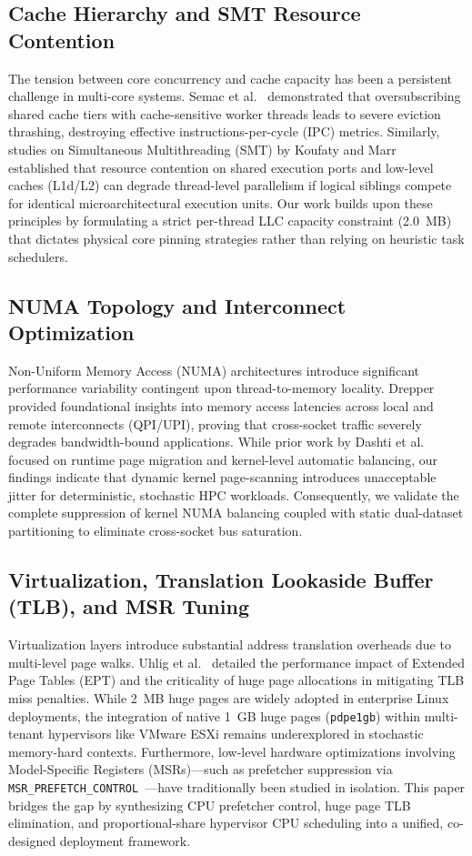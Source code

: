 \documentclass[journal]{IEEEtran}
\begin{document}
\subsection{Cache Hierarchy and SMT Resource Contention}
The tension between core concurrency and cache capacity has been a persistent challenge in multi-core systems. Semac et al.~\cite{semac2018cache} demonstrated that oversubscribing shared cache tiers with cache-sensitive worker threads leads to severe eviction thrashing, destroying effective instructions-per-cycle (IPC) metrics. Similarly, studies on Simultaneous Multithreading (SMT) by Koufaty and Marr~\cite{koufaty2003measuring} established that resource contention on shared execution ports and low-level caches (L1d/L2) can degrade thread-level parallelism if logical siblings compete for identical microarchitectural execution units. Our work builds upon these principles by formulating a strict per-thread LLC capacity constraint (2.0~MB) that dictates physical core pinning strategies rather than relying on heuristic task schedulers.

\subsection{NUMA Topology and Interconnect Optimization}
Non-Uniform Memory Access (NUMA) architectures introduce significant performance variability contingent upon thread-to-memory locality. Drepper~\cite{drepper2007what} provided foundational insights into memory access latencies across local and remote interconnects (QPI/UPI), proving that cross-socket traffic severely degrades bandwidth-bound applications. While prior work by Dashti et al.~\cite{dashti2013traffic} focused on runtime page migration and kernel-level automatic balancing, our findings indicate that dynamic kernel page-scanning introduces unacceptable jitter for deterministic, stochastic HPC workloads. Consequently, we validate the complete suppression of kernel NUMA balancing coupled with static dual-dataset partitioning to eliminate cross-socket bus saturation.

\subsection{Virtualization, Translation Lookaside Buffer (TLB), and MSR Tuning}
Virtualization layers introduce substantial address translation overheads due to multi-level page walks. Uhlig et al.~\cite{uhlig2005intel} detailed the performance impact of Extended Page Tables (EPT) and the criticality of huge page allocations in mitigating TLB miss penalties. While 2~MB huge pages are widely adopted in enterprise Linux deployments, the integration of native 1~GB huge pages (\texttt{pdpe1gb}) within multi-tenant hypervisors like VMware ESXi remains underexplored in stochastic memory-hard contexts. Furthermore, low-level hardware optimizations involving Model-Specific Registers (MSRs)---such as prefetcher suppression via \texttt{MSR\_PREFETCH\_CONTROL}~\cite{intel2020manual}---have traditionally been studied in isolation. This paper bridges the gap by synthesizing CPU prefetcher control, huge page TLB elimination, and proportional-share hypervisor CPU scheduling into a unified, co-designed deployment framework.
\end{document}
